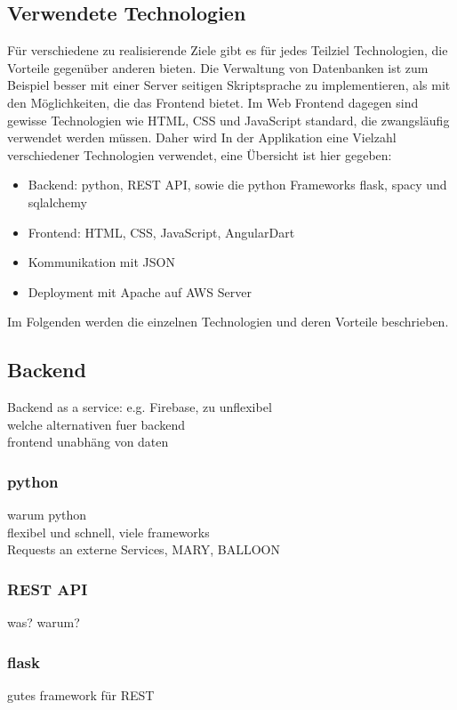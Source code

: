 \subsection{Verwendete Technologien}
Für verschiedene zu realisierende Ziele gibt es für jedes Teilziel Technologien, die Vorteile gegenüber anderen bieten. Die Verwaltung von Datenbanken ist zum Beispiel besser mit einer Server seitigen Skriptsprache zu implementieren, als mit den Möglichkeiten, die das Frontend bietet. Im Web Frontend dagegen sind gewisse Technologien wie HTML, CSS und JavaScript standard, die zwangsläufig verwendet werden müssen. Daher wird In der Applikation eine Vielzahl verschiedener Technologien verwendet, eine Übersicht ist hier gegeben:

\begin{itemize}
	\item Backend: python, REST API, sowie die python Frameworks flask, spacy und sqlalchemy
	\item Frontend: HTML, CSS, JavaScript, AngularDart
	\item Kommunikation mit JSON
	\item Deployment mit Apache auf AWS Server
\end{itemize}

Im Folgenden werden die einzelnen Technologien und deren Vorteile beschrieben.

\subsection{Backend}
Backend as a service: e.g. Firebase, zu unflexibel\\

welche alternativen fuer backend\\
frontend unabhäng von daten

\subsubsection{python}
\label{sec:python}
warum python\\
flexibel und schnell, viele frameworks\\
Requests an externe Services, MARY, BALLOON

\subsubsection{REST API}
\label{sec:REST}
was? warum?

\subsubsection{flask}
\label{sec:flask}
gutes framework für REST

